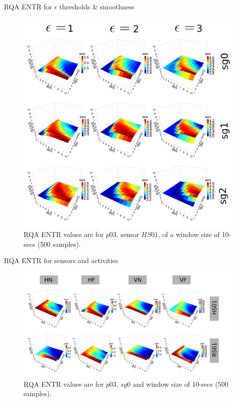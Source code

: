{

\begin{frame}{RQA ENTR for $\epsilon$ thresholds
	\& smoothness
}
    \begin{figure}
        \includegraphics[width=0.45\linewidth]{./figs/results/rqa-epsilons/versions/drawing-v00}{}
	\caption{
	RQA ENTR values are for
	$p03$, sensor $HS01$, of a window size of 10-secs (500 samples).
} 
   \end{figure}
	
\end{frame}
}



{

\begin{frame}{RQA ENTR for sensors and activities
}
    \begin{figure}
        \includegraphics[width=0.75\linewidth]{./figs/results/rqa-epsilons-sensors-activities/versions/drawing-v00}{}
	\caption{
	RQA ENTR values are for
	$p03$, $sg0$ and window size of 10-secs (500 samples).
} 
   \end{figure}
	
\end{frame}
}







